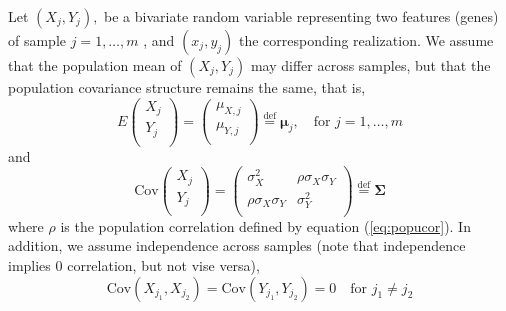\documentclass[12pt, a4paper]{article}
\newcommand{\cov}{\text{Cov}}
\begin{document}
	Let $(X_j, Y_j),$ be a bivariate random variable representing two features (genes) of sample $j 
	= 1, \ldots, m$ , and $(x_j, y_j)$ the corresponding realization.
	We assume that the population mean of $(X_j, Y_j)$ may differ across samples, but that the 
	population covariance structure remains the 
	same, that is,  
	\begin{equation}\label{eq:meanstruct}
	E  \left(\begin{array}{c}
	X_j\\
	Y_j\\	
	\end{array} \right) 
	= 	\left(\begin{array}{c}
	\mu_{X,j}\\
	\mu_{Y,j}\\
	\end{array} \right)\stackrel{\text{def}}{=} \bm \mu_j,  \text{~~ for $j = 1, \ldots, m$}
	\end{equation}
	and 
	\begin{equation}\label{eq:covstruct}
	\cov\left(\begin{array}{c}
	X_j\\
	Y_j\\	
	\end{array} \right)	
	= \left(
	\begin{array}{cc}
	\sigma_X^2 &\rho \sigma_X\sigma_Y \\
	\rho \sigma_X \sigma_Y & 	\sigma_Y^2 \\
	\end{array} 
	\right)
	\stackrel{\text{def}}{=} \bm \Sigma 
	\end{equation}
	where $\rho$ is the population correlation defined by equation (\ref{eq:popucor}). In addition, 
	we assume independence across samples (note that independence implies 0 correlation, but not 
	vise versa), 
	\begin{equation}\label{eq:indepsamples}
	\cov(X_{j_1}, X_{j_2}) = \cov(Y_{j_1}, Y_{j_2}) = 0 \text{~~~for $j_1\neq j_2$}
	\end{equation}
	
	
\end{document}
